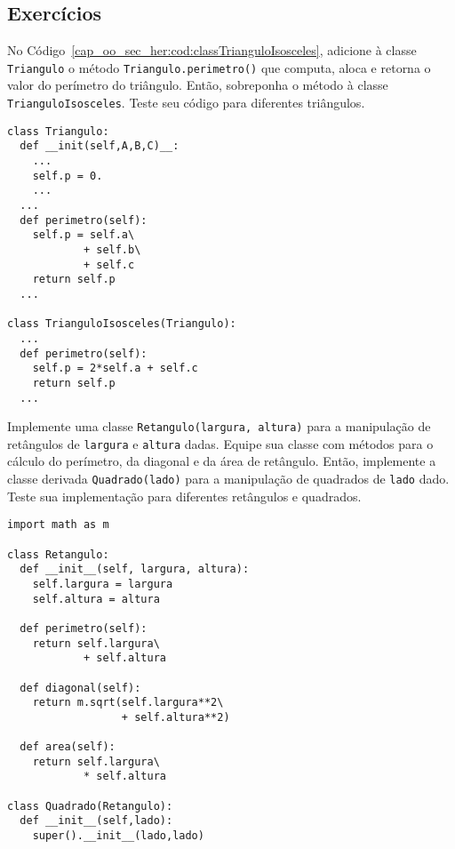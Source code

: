 \subsection{Exercícios}

\begin{exer}
  No Código~\ref{cap_oo_sec_her:cod:classTrianguloIsosceles}, adicione à classe \lstinline+Triangulo+ o método \lstinline+Triangulo.perimetro()+ que computa, aloca e retorna o valor do perímetro do triângulo. Então, sobreponha o método à classe \lstinline+TrianguloIsosceles+. Teste seu código para diferentes triângulos.
\end{exer}
\begin{resp}

\begin{lstlisting}
class Triangulo:
  def __init(self,A,B,C)__:
    ...
    self.p = 0.
    ...
  ...
  def perimetro(self):
    self.p = self.a\
            + self.b\
            + self.c
    return self.p
  ...

class TrianguloIsosceles(Triangulo):
  ...
  def perimetro(self):
    self.p = 2*self.a + self.c
    return self.p
  ...
\end{lstlisting}

\end{resp}

\begin{exer}\label{cap_oo_sec_her:exer:retangulo}
  Implemente uma classe \lstinline+Retangulo(largura, altura)+ para a manipulação de retângulos de \lstinline+largura+ e \lstinline+altura+ dadas. Equipe sua classe com métodos para o cálculo do perímetro, da diagonal e da área de retângulo. Então, implemente a classe derivada \lstinline+Quadrado(lado)+ para a manipulação de quadrados de \lstinline+lado+ dado. Teste sua implementação para diferentes retângulos e quadrados.
\end{exer}
\begin{resp}

\begin{lstlisting}
import math as m

class Retangulo:
  def __init__(self, largura, altura):
    self.largura = largura
    self.altura = altura

  def perimetro(self):
    return self.largura\
            + self.altura

  def diagonal(self):
    return m.sqrt(self.largura**2\
                  + self.altura**2)

  def area(self):
    return self.largura\
            * self.altura

class Quadrado(Retangulo):
  def __init__(self,lado):
    super().__init__(lado,lado)
\end{lstlisting}

\end{resp}

